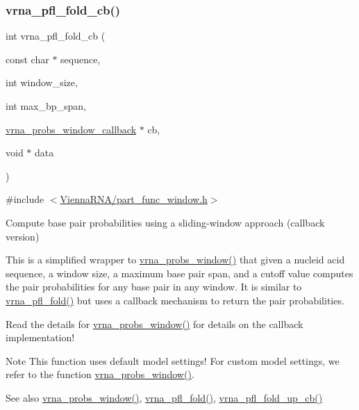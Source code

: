 \subsubsection{\texorpdfstring{vrna\_pfl\_fold\_cb()}{vrna\_pfl\_fold\_cb()}}
{\footnotesize\ttfamily int vrna\+\_\+pfl\+\_\+fold\+\_\+cb (\begin{DoxyParamCaption}\item[{const char $\ast$}]{sequence,  }\item[{int}]{window\+\_\+size,  }\item[{int}]{max\+\_\+bp\+\_\+span,  }\item[{\mbox{\hyperlink{group__part__func__window_gabe710a1182e6db69cc75329dfc9bed67}{vrna\+\_\+probs\+\_\+window\+\_\+callback}} $\ast$}]{cb,  }\item[{void $\ast$}]{data }\end{DoxyParamCaption})}



{\ttfamily \#include $<$\mbox{\hyperlink{part__func__window_8h}{Vienna\+R\+N\+A/part\+\_\+func\+\_\+window.\+h}}$>$}



Compute base pair probabilities using a sliding-\/window approach (callback version) 

This is a simplified wrapper to \mbox{\hyperlink{group__part__func__window_ga7115d012988541a65ec323c5f17a334b}{vrna\+\_\+probs\+\_\+window()}} that given a nucleid acid sequence, a window size, a maximum base pair span, and a cutoff value computes the pair probabilities for any base pair in any window. It is similar to \mbox{\hyperlink{group__part__func__window_ga6267230f20cab0e2315375310b4dad85}{vrna\+\_\+pfl\+\_\+fold()}} but uses a callback mechanism to return the pair probabilities.

Read the details for \mbox{\hyperlink{group__part__func__window_ga7115d012988541a65ec323c5f17a334b}{vrna\+\_\+probs\+\_\+window()}} for details on the callback implementation!

\begin{DoxyNote}{Note}
This function uses default model settings! For custom model settings, we refer to the function \mbox{\hyperlink{group__part__func__window_ga7115d012988541a65ec323c5f17a334b}{vrna\+\_\+probs\+\_\+window()}}.
\end{DoxyNote}
\begin{DoxySeeAlso}{See also}
\mbox{\hyperlink{group__part__func__window_ga7115d012988541a65ec323c5f17a334b}{vrna\+\_\+probs\+\_\+window()}}, \mbox{\hyperlink{group__part__func__window_ga6267230f20cab0e2315375310b4dad85}{vrna\+\_\+pfl\+\_\+fold()}}, \mbox{\hyperlink{group__part__func__window_gac3251d3da0238d6d9ffdd6703b00f1d3}{vrna\+\_\+pfl\+\_\+fold\+\_\+up\+\_\+cb()}}
\end{DoxySeeAlso}

